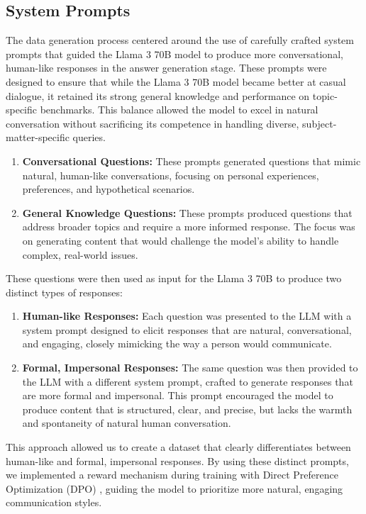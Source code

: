 \documentclass{article}
\begin{document}
\subsection{System Prompts}

The data generation process centered around the use of carefully crafted system prompts that guided the Llama 3 70B model to produce more conversational, human-like responses in the answer generation stage. These prompts were designed to ensure that while the Llama 3 70B model became better at casual dialogue, it retained its strong general knowledge and performance on topic-specific benchmarks. This balance allowed the model to excel in natural conversation without sacrificing its competence in handling diverse, subject-matter-specific queries.

\begin{enumerate}
    \item \textbf{Conversational Questions:} These prompts generated questions that mimic natural, human-like conversations, focusing on personal experiences, preferences, and hypothetical scenarios.
    
    \item \textbf{General Knowledge Questions:} These prompts produced questions that address broader topics and require a more informed response. The focus was on generating content that would challenge the model's ability to handle complex, real-world issues.\end{enumerate}
    
These questions were then used as input for the Llama 3 70B to produce two distinct types of responses:

\begin{enumerate}
    \item \textbf{Human-like Responses:} Each question was presented to the LLM with a system prompt designed to elicit responses that are natural, conversational, and engaging, closely mimicking the way a person would communicate.
    \item \textbf{Formal, Impersonal Responses:} The same question was then provided to the LLM with a different system prompt, crafted to generate responses that are more formal and impersonal. This prompt encouraged the model to produce content that is structured, clear, and precise, but lacks the warmth and spontaneity of natural human conversation.
\end{enumerate}

This approach allowed us to create a dataset that clearly differentiates between human-like and formal, impersonal responses. By using these distinct prompts, we implemented a reward mechanism during training with Direct Preference Optimization (DPO) \cite{rafailov2024directpreferenceoptimizationlanguage}, guiding the model to prioritize more natural, engaging communication styles.
\end{document}
